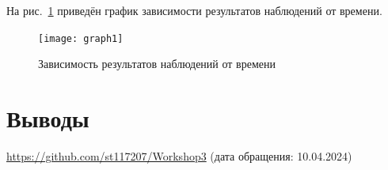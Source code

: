 На рис.~\ref{fig:graph1} приведён график зависимости результатов наблюдений от времени.
\begin{figure}[H]
\centering
\texttt{[image: graph1]}
\caption{Зависимость результатов наблюдений от времени}
\label{fig:graph1}
\end{figure}




\section{Выводы}



\begin{thebibliography}{9}

\url{https://github.com/st117207/Workshop3}  (дата обращения: 10.04.2024) 


\end{thebibliography}

